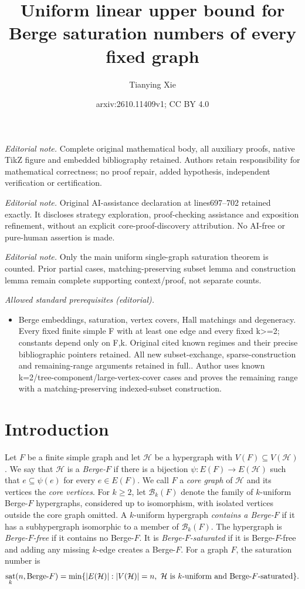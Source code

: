 \documentclass[10pt,a4paper]{article}
\title{Uniform linear upper bound for Berge saturation numbers of every fixed graph}
\author{Tianying Xie}
\date{arxiv:2610.11409v1; CC BY 4.0}
\numberwithin{equation}{section}
\theoremstyle{definition}
\theoremstyle{plain}
\DeclareMathOperator{\sat}{sat}
\newcommand{\BF}{\textup{Berge-}F}
\newcommand{\HH}{\mathcal H}
\begin{document}
\maketitle
\noindent\textit{Editorial note.} Complete original mathematical body, all auxiliary proofs, native TikZ figure and embedded bibliography retained. Authors retain responsibility for mathematical correctness; no proof repair, added hypothesis, independent verification or certification.\par\medskip
\noindent\textit{Editorial note.} Original AI-assistance declaration at lines697--702 retained exactly. It discloses strategy exploration, proof-checking assistance and exposition refinement, without an explicit core-proof-discovery attribution. No AI-free or pure-human assertion is made.\par\medskip
\noindent\textit{Editorial note.} Only the main uniform single-graph saturation theorem is counted. Prior partial cases, matching-preserving subset lemma and construction lemma remain complete supporting context/proof, not separate counts.\par\medskip
\noindent\textit{Allowed standard prerequisites (editorial).}\begin{itemize}
\item Berge embeddings, saturation, vertex covers, Hall matchings and degeneracy. Every fixed finite simple F with at least one edge and every fixed k>=2; constants depend only on F,k. Original cited known regimes and their precise bibliographic pointers retained. All new subset-exchange, sparse-construction and remaining-range arguments retained in full.. Author uses known k=2/tree-component/large-vertex-cover cases and proves the remaining range with a matching-preserving indexed-subset construction.
\end{itemize}\medskip
\section{Introduction}\label{sec:introduction}

Let $F$ be a finite simple graph and let $\HH$ be a hypergraph with
$V(F)\subseteq V(\HH)$. We say that
$\HH$ is a \emph{Berge-$F$} if there is a bijection
$\psi:E(F)\longrightarrow E(\HH)$ such that $e\subseteq\psi(e)$
for every $e\in E(F)$. We call $F$ a \emph{core graph} of $\HH$
and its vertices the \emph{core vertices}.
For $k\ge2$, let $\mathcal B_k(F)$ denote the family of $k$-uniform
Berge-$F$ hypergraphs, considered up to isomorphism, with isolated
vertices outside the core graph omitted.
A $k$-uniform hypergraph \emph{contains a Berge-$F$} if it has a
subhypergraph isomorphic to a member of $\mathcal B_k(F)$. 
The hypergraph is \emph{Berge-$F$-free} if it contains no Berge-$F$.
It is \emph{Berge-$F$-saturated} if
it is Berge-$F$-free and adding any missing $k$-edge creates a Berge-$F$.
For a graph $F$, the saturation number is
\[
 \sat_k(n,\BF)=\min\{|E(\HH)|:|V(\HH)|=n,\ \HH\text{ is $k$-uniform and
 Berge-$F$-saturated}\}.
\]
\end{document}
